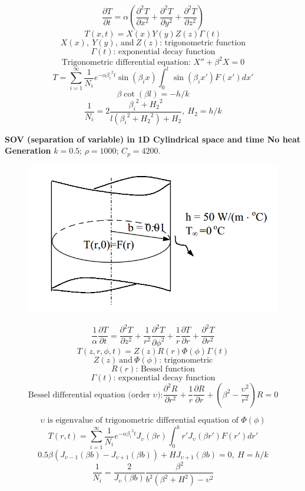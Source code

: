 \begin{appendices}
\begin{example}
$$\frac{\partial T}{\partial t}=
\alpha\left(\frac{\partial^2 T}{\partial x^2}+
\frac{\partial^2 T}{\partial y^2}+
\frac{\partial^2 T}{\partial z^2}\right)$$
$$T(x,t)=X(x)Y(y)Z(z)\Gamma(t)$$
$$X(x),~Y(y),~\text{and} ~Z(z)\text{: trigonometric function}$$
$$\Gamma(t)\text{: exponential decay function}$$
$$\text{Trigonometric differential equation: }X''+\beta^2X=0$$
$$T=\sum_{i=1}^{\infty} \frac{1}{N_i}e^{-\alpha{\beta_i}^2t}\sin{(\beta_i x)}\int_0^{l}\sin{(\beta_i x')}F(x')dx'$$
$$\beta\cot{(\beta l)}=-h/k$$
$$\frac{1}{N_i}=2\frac{{\beta_i}^2+{H_2}^2}{l({\beta_i}^2+{H_2}^2)+H_2},
~H_2=h/k$$
\end{example}
\begin{example}
\textbf{SOV (separation of variable) in 1D Cylindrical space and time
No heat Generation}
$k = 0.5$; $\rho= 1000$; $C_p = 4200$.
\begin{figure}[H]
  \centering
    \includegraphics[scale=0.5]{figures/appendixA/6}
\end{figure}
$$\frac{1}{\alpha}\frac{\partial T}{\partial t}=
\frac{\partial^2 T}{\partial z^2}+
\frac{1}{r^2}\frac{\partial^2 T}{\partial \phi^2}+
\frac{1}{r}\frac{\partial T}{\partial r}+
\frac{\partial^2 T}{\partial r^2}$$
$$T(z,r,\phi,t)=Z(z)R(r)\Phi(\phi)\Gamma(t)$$
$$Z(z)~\text{and} ~\Phi(\phi)\text{: trigonometric}$$
$$R(r)\text{: Bessel function}$$
$$\Gamma(t)\text{: exponential decay function}$$
$$\text{Bessel differential equation (order } \upsilon\text{):}
\frac{\partial^2 R}{\partial r^2}+
\frac{1}{r}\frac{\partial R}{\partial r}+
\left(\beta^2-\frac{\upsilon^2}{r^2}\right) R=0
$$

$$\upsilon \text{ is eigenvalue of trigonometric differential equation of } \Phi(\phi)$$
$$T(r,t)=\sum_{i=1}^{\infty} \frac{1}{N_i}e^{-\alpha{\beta_i}^2t}J_\upsilon(\beta r)\int_0^{b}r'J_\upsilon(\beta r')F(r')dr'$$
$$0.5\beta(J_{\upsilon-1}(\beta b)-
J_{\upsilon+1}(\beta b))+
HJ_{\upsilon+1}(\beta b)=0,
~H=h/k
$$
$$\frac{1}{N_i}=\frac{2}{J_\upsilon(\beta b)}
\frac{\beta^2}{b^2(\beta^2+H^2)-\upsilon^2}
$$
\end{example}


\end{appendices}
